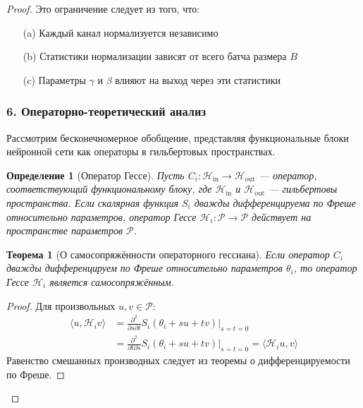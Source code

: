 \documentclass[a4paper,12pt]{article}
\newtheorem{theorem}{Теорема}
\newtheorem{definition}{Определение}
\begin{document}
\begin{proof}
    Это ограничение следует из того, что:
    \begin{enumerate}
    \item[(a)] Каждый канал нормализуется независимо
    \item[(b)] Статистики нормализации зависят от всего батча размера $B$
    \item[(c)] Параметры $\gamma$ и $\beta$ влияют на выход через эти статистики
    \end{enumerate}
    
    \subsubsection*{6. Операторно-теоретический анализ}
    
    Рассмотрим бесконечномерное обобщение, представляя функциональные блоки нейронной сети как операторы в гильбертовых пространствах.
    
    \begin{definition}[Оператор Гессе]
    Пусть $C_i: \mathcal{H}_{\text{in}} \rightarrow \mathcal{H}_{\text{out}}$ — оператор, соответствующий функциональному блоку, где $\mathcal{H}_{\text{in}}$ и $\mathcal{H}_{\text{out}}$ — гильбертовы пространства. Если скалярная функция $S_i$ дважды дифференцируема по Фреше относительно параметров, оператор Гессе $\mathcal{H}_i: \mathcal{P} \rightarrow \mathcal{P}$ действует на пространстве параметров $\mathcal{P}$.
    \end{definition}
    
    \begin{theorem}[О самосопряжённости операторного гессиана]
    Если оператор $C_i$ дважды дифференцируем по Фреше относительно параметров $\theta_i$, то оператор Гессе $\mathcal{H}_i$ является самосопряжённым.
    \end{theorem}
    
    \begin{proof}
    Для произвольных $u, v \in \mathcal{P}$:
    \begin{align}
    \langle u, \mathcal{H}_i v \rangle &= \frac{\partial^2}{\partial s \partial t} S_i(\theta_i + su + tv) \bigg|_{s=t=0} \\
    &= \frac{\partial^2}{\partial t \partial s} S_i(\theta_i + su + tv) \bigg|_{s=t=0} = \langle \mathcal{H}_i u, v \rangle
    \end{align}
    Равенство смешанных производных следует из теоремы о дифференцируемости по Фреше.
    \end{proof}
    

\end{proof}
\end{document}
